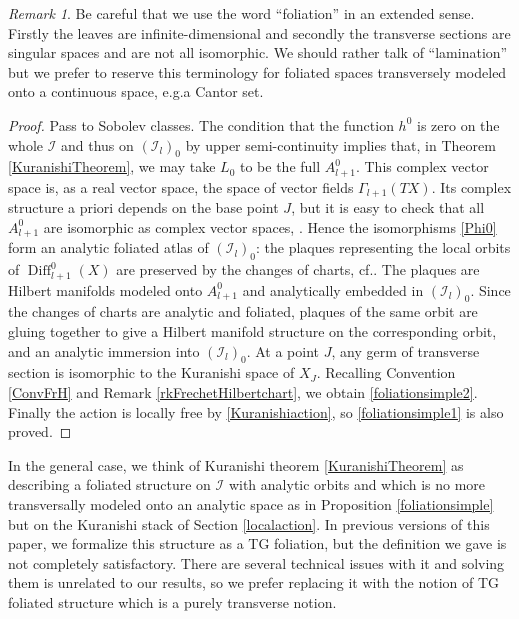\documentclass[10pt]{amsart}
\let\mathcal\mathscr
\DeclareMathOperator{\Diff}{Diff}
\theoremstyle{plain}
\theoremstyle{definition}
\theoremstyle{remark}
\newtheorem{remark}[theorem]{Remark}
\numberwithin{equation}{section}
\newcommand{\cI}{\mathcal{I}}
\providecommand{\eg}{e.g.}\providecommand{\ie}{i.e.}\providecommand{\etc}{etc.}\providecommand{\resp}{resp.}\providecommand{\cf}{cf.}
\begin{document}
\begin{remark}
\label{foldef}
Be careful that we use the word ``foliation'' in an extended sense. Firstly the leaves are infinite-dimensional and secondly the transverse sections are singular spaces and are not all isomorphic. We should rather talk of ``lamination'' but we prefer to reserve this terminology for foliated spaces transversely modeled onto a continuous space, \eg a Cantor set.
\end{remark}

\begin{proof}
Pass to Sobolev classes. The condition that the function $h^0$ is zero on the whole $\cI$ and thus on $(\cI_l)_0$ by upper semi-continuity implies that, in Theorem \ref{KuranishiTheorem}, we may take $L_0$ to be the full $A^0_{l+1}$. This complex vector space is, as a real vector space, the space of vector fields $\Gamma_{l+1}(TX)$. Its complex structure a priori depends on the base point $J$, but it is easy to check that all $A^0_{l+1}$ are isomorphic as complex vector spaces, \cite[Lem.\,7.1]{circle}. Hence the isomorphisms \eqref{Phi0} form an analytic foliated atlas of $(\cI_l)_0$: the plaques representing the local orbits of $\Diff^0_{l+1}(X)$ are preserved by the changes of charts, \cf \cite[\S 6]{circle}. The plaques are Hilbert manifolds modeled onto $A^0_{l+1}$ and analytically embedded in $(\cI_l)_0$. Since the changes of charts are analytic and foliated, plaques of the same orbit are gluing together to give a Hilbert manifold structure on the corresponding orbit, and an analytic immersion into $(\cI_l)_0$. At a point $J$, any germ of transverse section is isomorphic to the Kuranishi space of $X_J$. Recalling Convention \ref{ConvFrH} and Remark \ref{rkFrechetHilbertchart}, we obtain \eqref{foliationsimple2}. Finally the action is locally free by \eqref{Kuranishiaction}, so \eqref{foliationsimple1} is also proved.
\end{proof}

In the general case, we think of Kuranishi theorem \ref{KuranishiTheorem} as describing a foliated structure on $\cI$ with analytic orbits and which is no more transversally modeled onto an analytic space as in Proposition \ref{foliationsimple} but on the Kuranishi stack of Section \ref{localaction}. In previous versions of this paper, we formalize this structure as a TG foliation, but the definition we gave is not completely satisfactory. There are several technical issues with it and solving them is unrelated to our results, so we prefer replacing it with the notion of TG foliated structure which is a purely transverse notion.\enlargethispage{-\baselineskip}%
\end{document}
